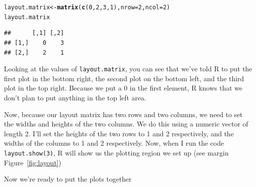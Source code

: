 \documentclass{tufte-book}\usepackage[]{graphicx}\usepackage[]{color}
\makeatletter
\newcommand{\hlnum}[1]{\textcolor[rgb]{0.686,0.059,0.569}{#1}}%
\newcommand{\hlstd}[1]{\textcolor[rgb]{0.345,0.345,0.345}{#1}}%
\newcommand{\hlkwb}[1]{\textcolor[rgb]{0.69,0.353,0.396}{#1}}%
\newcommand{\hlkwc}[1]{\textcolor[rgb]{0.333,0.667,0.333}{#1}}%
\newcommand{\hlkwd}[1]{\textcolor[rgb]{0.737,0.353,0.396}{\textbf{#1}}}%
\newenvironment{kframe}{%
 \def\at@end@of@kframe{}%
 \ifinner\ifhmode%
  \def\at@end@of@kframe{\end{minipage}}%
  \begin{minipage}{\columnwidth}%
 \fi\fi%
 \def\FrameCommand##1{\hskip\@totalleftmargin \hskip-\fboxsep
 \colorbox{shadecolor}{##1}\hskip-\fboxsep
     \hskip-\linewidth \hskip-\@totalleftmargin \hskip\columnwidth}%
 \MakeFramed {\advance\hsize-\width
   \@totalleftmargin\z@ \linewidth\hsize
   \@setminipage}}%
 {\par\unskip\endMakeFramed%
 \at@end@of@kframe}
\newenvironment{knitrout}{}{} %
\makeatother
\begin{document}
\begin{knitrout}
\color{fgcolor}\begin{kframe}
\begin{alltt}
\hlstd{layout.matrix} \hlkwb{<-} \hlkwd{matrix}\hlstd{(}\hlkwd{c}\hlstd{(}\hlnum{0}\hlstd{,} \hlnum{2}\hlstd{,} \hlnum{3}\hlstd{,} \hlnum{1}\hlstd{),} \hlkwc{nrow} \hlstd{=} \hlnum{2}\hlstd{,} \hlkwc{ncol} \hlstd{=} \hlnum{2}\hlstd{)}
\hlstd{layout.matrix}
\end{alltt}
\begin{verbatim}
##      [,1] [,2]
## [1,]    0    3
## [2,]    2    1
\end{verbatim}
\end{kframe}
\end{knitrout}

Looking at the values of \texttt{layout.matrix}, you can see that we've told R to put the first plot in the bottom right, the second plot on the bottom left, and the third plot in the top right. Because we put a 0 in the first element, R knows that we don't plan to put anything in the top left area.

Now, because our layout matrix has two rows and two columns, we need to set the widths and heights of the two columns. We do this using a numeric vector of length 2. I'll set the heights of the two rows to 1 and 2 respectively, and the widths of the columns to 1 and 2 respectively. Now, when I run the code \texttt{layout.show(3)}, R will show us the plotting region we set up (see margin Figure~\ref{fig:layout})

Now we're ready to put the plots together
\end{document}

